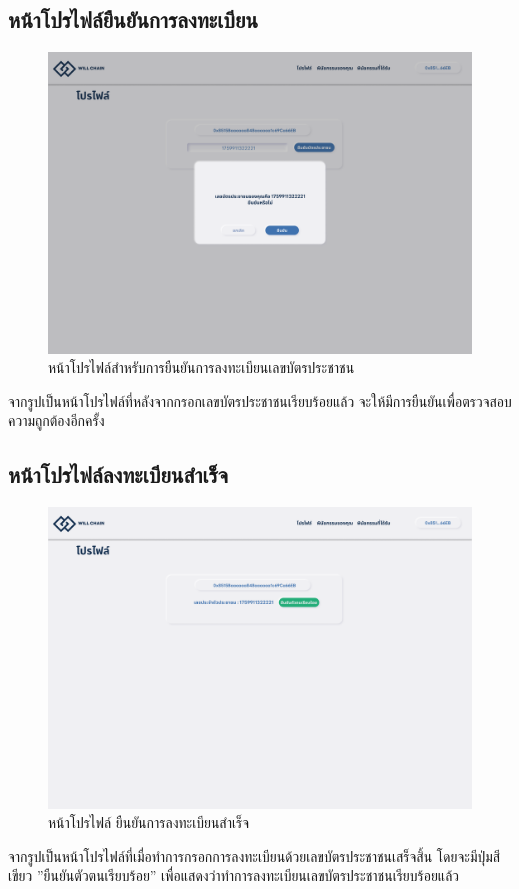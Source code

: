 \documentclass[12pt,oneside,openright,a4paper]{cpe-thai-project}
\begin{document}
\subsection{หน้าโปรไฟล์ยืนยันการลงทะเบียน}
		\begin{figure}[!thb]
			\centering
			\includegraphics[scale=0.2]{profileConfirm}
			\caption{หน้าโปรไฟล์สำหรับการยืนยันการลงทะเบียนเลขบัตรประชาชน}
		\end{figure}
		\FloatBarrier
		\tab จากรูปเป็นหน้าโปรไฟล์ที่หลังจากกรอกเลขบัตรประชาชนเรียบร้อยแล้ว จะให้มีการยืนยันเพื่อตรวจสอบความถูกต้องอีกครั้ง
\subsection{หน้าโปรไฟล์ลงทะเบียนสำเร็จ}
		\begin{figure}[!thb]
			\centering
			\includegraphics[scale=0.2]{profileSuccess}
			\caption{หน้าโปรไฟล์ ยืนยันการลงทะเบียนสำเร็จ}
		\end{figure}
		\FloatBarrier
		\tab จากรูปเป็นหน้าโปรไฟล์ที่เมื่อทำการกรอกการลงทะเบียนด้วยเลขบัตรประชาชนเสร็จสิ้น โดยจะมีปุ่มสีเขียว ''ยืนยันตัวตนเรียบร้อย'' เพื่อแสดงว่าทำการลงทะเบียนเลขบัตรประชาชนเรียบร้อยแล้ว
\end{document}
